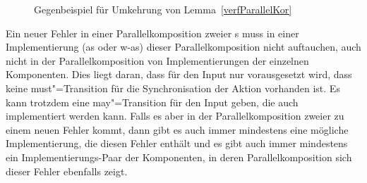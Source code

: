 \begin{figure}[htbp]
  \begin{center}
    \caption{Gegenbeispiel für Umkehrung von Lemma~\ref{verfParallelKor}}
    \label{impParallelFig}
  \end{center}
\end{figure}

Ein neuer Fehler in einer Parallelkomposition zweier \MEIO{}s
muss in einer Implementierung (as oder w-as) dieser Parallelkomposition nicht
auftauchen, auch nicht in der Parallelkomposition von Implementierungen der
einzelnen Komponenten. Dies liegt daran, dass für den Input nur vorausgesetzt
wird, dass keine must"=Transition für die Synchronisation der Aktion vorhanden
ist. Es kann trotzdem eine may"=Transition für den Input geben, die auch
implementiert werden kann. Falls es aber in der Parallelkomposition zweier
\MEIO{} zu einem neuen Fehler kommt, dann gibt es auch immer mindestens eine
mögliche Implementierung, die diesen Fehler enthält und es gibt auch immer
mindestens ein Implementierungs-Paar der Komponenten, in deren
Parallelkomposition sich dieser Fehler ebenfalls zeigt.

